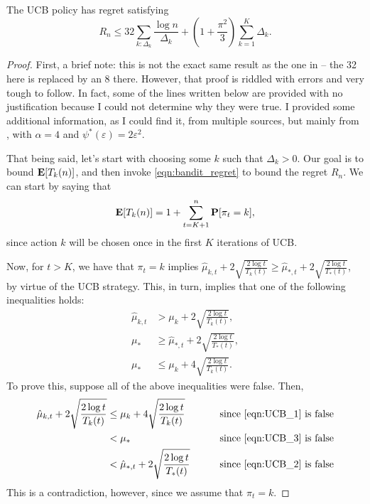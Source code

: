 \begin{theorem}
The UCB policy has regret satisfying
\[
R_n \leq 32 \sum_{k : \Delta_k} \frac{\log n}{\Delta_k} + \left(1 + \frac{\pi^2}{3} \right) \sum_{k=1}^K \Delta_k.
\]
\end{theorem}

\begin{proof}
First, a brief note: this is not the exact same result as the one in \cite[Lecture~18]{rigollet} -- the 32 here is replaced by an 8 there. However, that proof is riddled with errors and very tough to follow. In fact, some of the lines written below are provided with no justification because I could not determine why they were true. I provided some additional information, as I could find it, from multiple sources, but mainly from \cite[Theorem~2.1]{bubeck2012regret}, with $\alpha = 4$ and $\psi^*(\varepsilon) = 2 \varepsilon^2$. 

That being said, let's start with choosing some $k$ such that $\Delta_k > 0$. Our goal is to bound $\mathbf{E}[T_k(n)]$, and then invoke \eqref{eqn:bandit_regret} to bound the regret $R_n$. We can start by saying that 
\[
\mathbf{E}[T_k(n)] = 1 + \sum_{t=K+1}^n \mathbf{P}[\pi_t = k],
\]
since action $k$ will be chosen once in the first $K$ iterations of UCB.

Now, for $t > K$, we have that $\pi_t = k$ implies $\hat \mu_{k, t} + 2 \sqrt{\frac{2 \log t}{T_k(t)}} \geq \hat \mu_{*, t} + 2 \sqrt{\frac{2 \log t}{T_*(t)}}$, by virtue of the UCB strategy. This, in turn, implies that one of the following inequalities holds:
\begin{align}
\hat \mu_{k, t} &> \mu_k + 2 \sqrt{\frac{2 \log t}{T_k(t)}}, \label{eqn:UCB_1} \\
\mu_* &\geq \hat \mu_{*, t} + 2 \sqrt{\frac{2 \log t}{T_*(t)}}, \label{eqn:UCB_2}\\
\mu_* &\leq \mu_k + 4 \sqrt{\frac{2 \log t}{T_k(t)}}. \label{eqn:UCB_3}
\end{align}
To prove this, suppose all of the above inequalities were false. Then, 
\begin{align*}
\hat \mu_{k, t} + 2 \sqrt{\frac{2 \log t}{T_k(t)}} &\leq \mu_k + 4 \sqrt{\frac{2 \log t}{T_k(t)}} &\qquad \text{since \eqref{eqn:UCB_1} is false}\\
&< \mu_* &\qquad \text{since \eqref{eqn:UCB_3} is false} \\
&< \hat \mu_{*, t} + 2 \sqrt{\frac{2 \log t}{T_*(t)}} &\qquad \text{since \eqref{eqn:UCB_2} is false}
\end{align*}
This is a contradiction, however, since we assume that $\pi_t = k$.


\end{proof}
